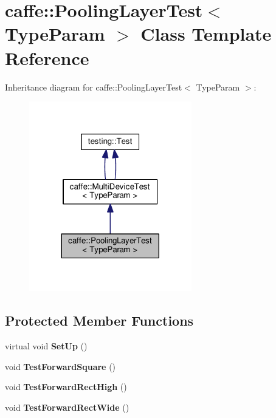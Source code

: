 \hypertarget{classcaffe_1_1_pooling_layer_test}{}\section{caffe\+:\+:Pooling\+Layer\+Test$<$ Type\+Param $>$ Class Template Reference}
\label{classcaffe_1_1_pooling_layer_test}


Inheritance diagram for caffe\+:\+:Pooling\+Layer\+Test$<$ Type\+Param $>$\+:
\nopagebreak
\begin{figure}[H]
\begin{center}
\leavevmode
\includegraphics[width=200pt]{classcaffe_1_1_pooling_layer_test__inherit__graph}
\end{center}
\end{figure}
\subsection*{Protected Member Functions}
\begin{DoxyCompactItemize}
\item 
\mbox{\label{classcaffe_1_1_pooling_layer_test_a64a6a724bd8279de75dda57b4b72a33f}} 
virtual void {\bfseries Set\+Up} ()
\item 
\mbox{\label{classcaffe_1_1_pooling_layer_test_ae9d46687400f7accf357c7bf1d60c2be}} 
void {\bfseries Test\+Forward\+Square} ()
\item 
\mbox{\label{classcaffe_1_1_pooling_layer_test_a4c770722f8472b89b8f59e4e1796b6dc}} 
void {\bfseries Test\+Forward\+Rect\+High} ()
\item 
\mbox{\label{classcaffe_1_1_pooling_layer_test_ab5359bc1fe42df2f9943aa80c40d782a}} 
void {\bfseries Test\+Forward\+Rect\+Wide} ()
\end{DoxyCompactItemize}
